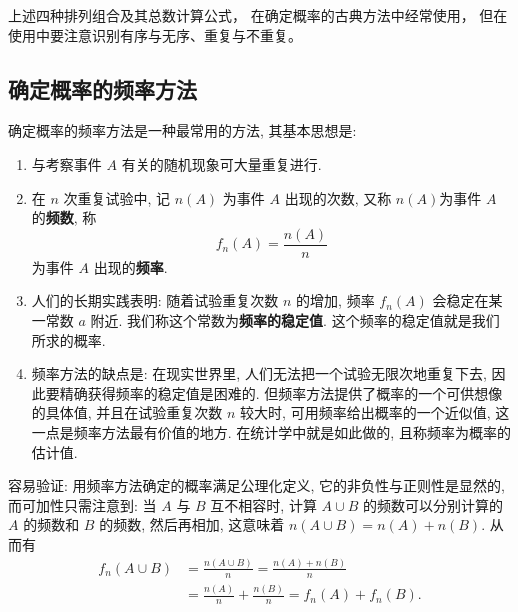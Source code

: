 上述四种排列组合及其总数计算公式，
在确定概率的古典方法中经常使用，
但在使用中要注意识别有序与无序、重复与不重复。

\subsection{确定概率的频率方法}

确定概率的频率方法是一种最常用的方法,
其基本思想是:
\begin{enumerate}
  \item 与考察事件 $A$ 有关的随机现象可大量重复进行.
  \item 在 $n$ 次重复试验中,
  记 $n (A)$ 为事件 $A$ 出现的次数,
  又称 $n (A)$为事件 $A$ 的\textbf{频数},
  称
  \begin{equation}
    f_n (A) = \frac{n (A)}{n}\label{eq1.2.4}
  \end{equation}
  为事件 $A$ 出现的\textbf{频率}.

  \item 人们的长期实践表明:
  随着试验重复次数 $n$ 的增加,
  频率 $f_n (A)$ 会稳定在某一常数 $a$ 附近.
  我们称这个常数为\textbf{频率的稳定值}.
  这个频率的稳定值就是我们所求的概率.

  \item 频率方法的缺点是:
  在现实世界里,
  人们无法把一个试验无限次地重复下去,
  因此要精确获得频率的稳定值是困难的.
  但频率方法提供了概率的一个可供想像的具体值,
  并且在试验重复次数 $n$ 较大时,
  可用频率给出概率的一个近似值,
  这一点是频率方法最有价值的地方.
  在统计学中就是如此做的,
  且称频率为概率的估计值.
\end{enumerate}

容易验证:
用频率方法确定的概率满足公理化定义,
它的非负性与正则性是显然的,
而可加性只需注意到:
当 $A$ 与 $B$ 互不相容时,
计算 $A \cup B$ 的频数可以分别计算的 $A$ 的频数和 $B$ 的频数,
然后再相加,
这意味着 $n (A \cup B) = n (A) + n (B)$.
从而有
\begin{align*}
  f _n (A \cup B) &= \frac{n (A \cup B)}{n} = \frac{n (A) + n (B)}{n}\\
  &= \frac{n (A)}{n} + \frac{n (B)}{n} = f _n (A) + f _n (B).
\end{align*}


